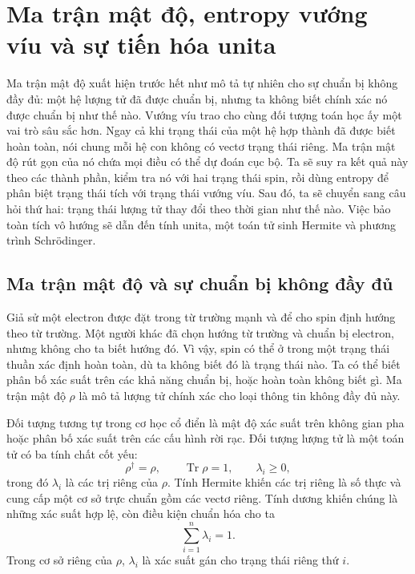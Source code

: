 \chapter{Ma trận mật độ, entropy vướng víu và sự tiến hóa unita}

Ma trận mật độ xuất hiện trước hết như mô tả tự nhiên cho sự chuẩn bị không đầy đủ: một hệ lượng tử đã được chuẩn bị, nhưng ta không biết chính xác nó được chuẩn bị như thế nào. Vướng víu trao cho cùng đối tượng toán học ấy một vai trò sâu sắc hơn. Ngay cả khi trạng thái của một hệ hợp thành đã được biết hoàn toàn, nói chung mỗi hệ con không có vectơ trạng thái riêng. Ma trận mật độ rút gọn của nó chứa mọi điều có thể dự đoán cục bộ. Ta sẽ suy ra kết quả này theo các thành phần, kiểm tra nó với hai trạng thái spin, rồi dùng entropy để phân biệt trạng thái tích với trạng thái vướng víu. Sau đó, ta sẽ chuyển sang câu hỏi thứ hai: trạng thái lượng tử thay đổi theo thời gian như thế nào. Việc bảo toàn tích vô hướng sẽ dẫn đến tính unita, một toán tử sinh Hermite và phương trình Schr\"odinger.

\section{Ma trận mật độ và sự chuẩn bị không đầy đủ}

Giả sử một electron được đặt trong từ trường mạnh và để cho spin định hướng theo từ trường. Một người khác đã chọn hướng từ trường và chuẩn bị electron, nhưng không cho ta biết hướng đó. Vì vậy, spin có thể ở trong một trạng thái thuần xác định hoàn toàn, dù ta không biết đó là trạng thái nào. Ta có thể biết phân bố xác suất trên các khả năng chuẩn bị, hoặc hoàn toàn không biết gì. Ma trận mật độ \(\rho\) là mô tả lượng tử chính xác cho loại thông tin không đầy đủ này.

Đối tượng tương tự trong cơ học cổ điển là mật độ xác suất trên không gian pha hoặc phân bố xác suất trên các cấu hình rời rạc. Đối tượng lượng tử là một toán tử có ba tính chất cốt yếu:
\begin{equation}
\rho^\dagger=\rho,
\qquad
\operatorname{Tr}\rho=1,
\qquad
\lambda_i\geq 0,
\end{equation}
trong đó \(\lambda_i\) là các trị riêng của \(\rho\). Tính Hermite khiến các trị riêng là số thực và cung cấp một cơ sở trực chuẩn gồm các vectơ riêng. Tính dương khiến chúng là những xác suất hợp lệ, còn điều kiện chuẩn hóa cho ta
\begin{equation}
\sum_{i=1}^{n}\lambda_i=1.
\end{equation}
Trong cơ sở riêng của \(\rho\), \(\lambda_i\) là xác suất gán cho trạng thái riêng thứ \(i\).

